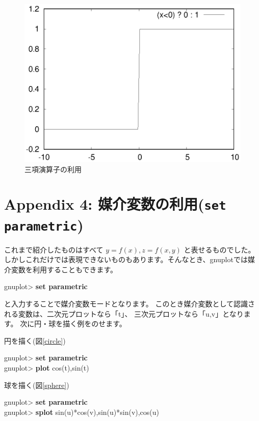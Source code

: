\documentclass[a4j]{ujarticle} %
\newenvironment{terminal}{%
  \begin{center}
   \begin{minipage}{.8\textwidth}
    \setlength{\FrameSep}{.5\FrameSep}%
    \begin{framed}\ttfamily\small%
     \setlength\baselineskip{.85\baselineskip}%
}{%
    \end{framed}
   \end{minipage}
  \end{center}%
}
\begin{document}
\begin{figure}
\begin{center}
\begin{minipage}[hbtp]{0.49\textwidth}
 \includegraphics[width=\hsize]{ternary_operation.eps}
 \caption{三項演算子の利用}
\label{ternary}
\end{minipage}
\end{center}
\end{figure}

\section*{Appendix 4:  媒介変数の利用({\tt\bf set parametric})}
これまで紹介したものはすべて $y=f(x),z=f(x,y)$ と表せるものでした。
しかしこれだけでは表現できないものもあります。そんなとき、gnuplotでは媒介変数を利用することもできます。
\begin{terminal}
 gnuplot> {\bf set parametric}
\end{terminal}
と入力することで媒介変数モードとなります。
このとき媒介変数として認識される変数は、二次元プロットなら「t」、
三次元プロットなら「u,v」となります。
次に円・球を描く例をのせます。

円を描く(図\ref{circle})
\begin{terminal}
 gnuplot> {\bf set parametric}\\
 gnuplot> {\bf plot} cos(t),sin(t)
\end{terminal}

球を描く(図\ref{sphere})
\begin{terminal}
 gnuplot> {\bf set parametric}\\
 gnuplot> {\bf splot} sin(u)*cos(v),sin(u)*sin(v),cos(u)
\end{terminal}
\end{document}
